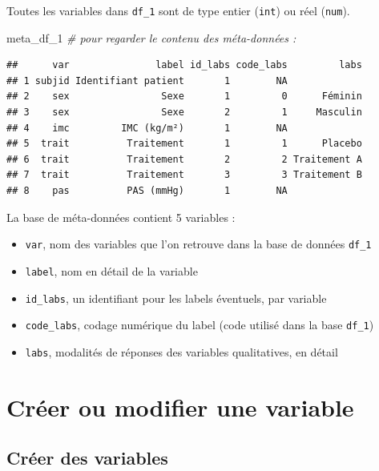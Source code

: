 \documentclass[
]{book}
\newenvironment{Shaded}{\begin{snugshade}}{\end{snugshade}}
\newcommand{\CommentTok}[1]{\textcolor[rgb]{0.56,0.35,0.01}{\textit{#1}}}
\newcommand{\NormalTok}[1]{#1}
\providecommand{\tightlist}{%
  \setlength{\itemsep}{0pt}\setlength{\parskip}{0pt}}
\begin{document}
Toutes les variables dans \texttt{df\_1} sont de type entier (\texttt{int}) ou réel (\texttt{num}).

\begin{Shaded}
\begin{Highlighting}[]
\NormalTok{meta\_df\_1 }\CommentTok{\# pour regarder le contenu des méta{-}données : }
\end{Highlighting}
\end{Shaded}

\begin{verbatim}
##      var               label id_labs code_labs         labs
## 1 subjid Identifiant patient       1        NA             
## 2    sex                Sexe       1         0      Féminin
## 3    sex                Sexe       2         1     Masculin
## 4    imc         IMC (kg/m²)       1        NA             
## 5  trait          Traitement       1         1      Placebo
## 6  trait          Traitement       2         2 Traitement A
## 7  trait          Traitement       3         3 Traitement B
## 8    pas          PAS (mmHg)       1        NA
\end{verbatim}

La base de méta-données contient 5 variables :

\begin{itemize}
\tightlist
\item
  \texttt{var}, nom des variables que l'on retrouve dans la base de données \texttt{df\_1}
\item
  \texttt{label}, nom en détail de la variable\\
\item
  \texttt{id\_labs}, un identifiant pour les labels éventuels, par variable
\item
  \texttt{code\_labs}, codage numérique du label (code utilisé dans la base \texttt{df\_1})
\item
  \texttt{labs}, modalités de réponses des variables qualitatives, en détail
\end{itemize}

\section{Créer ou modifier une variable}\label{cruxe9er-ou-modifier-une-variable}

\subsection{Créer des variables}\label{cruxe9er-des-variables}
\end{document}
